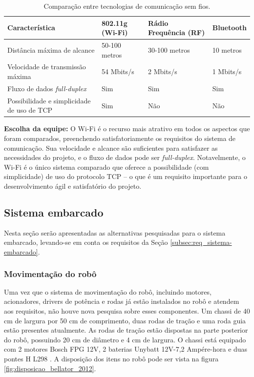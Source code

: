 \begin{table}[h]
  \caption{Comparação entre tecnologias de comunicação sem fios.}
  \centering
  \begin{tabular}{p{4.5cm}|p{3cm}p{4cm}p{2cm}}
    \toprule
    \textbf{Característica} & \textbf{802.11g (Wi-Fi)} & \multicolumn{1}{l}{\textbf{Rádio Frequência (RF)}} & \textbf{Bluetooth}  \\
    \hline
    Distância máxima de alcance & 50-100 metros  & 30-100 metros & 10 metros \\
    \hline
    Velocidade de transmissão máxima & 54 Mbits/s & 2 Mbits/s & 1 Mbits/s \\
    \hline
    Fluxo de dados \textit{full-duplex} & Sim & Sim & Sim \\
    \hline
    Possibilidade e simplicidade de uso de TCP & Sim & Não & Não \\
    \bottomrule
  \end{tabular}
  \label{tab:alternativas_comunicacao}
\end{table}

\textbf{Escolha da equipe:} O Wi-Fi é o recurso mais atrativo em todos os aspectos que foram comparados, preenchendo satisfatoriamente os requisitos do sistema de comunicação. Sua velocidade e alcance são suficientes para satisfazer as necessidades do projeto, e o fluxo de dados pode ser \textit{full-duplex}. Notavelmente, o Wi-Fi é o único sistema comparado que oferece a possibilidade (com simplicidade) de uso do protocolo TCP -- o que é um requisito importante para o desenvolvimento ágil e satisfatório do projeto.


\subsection{Sistema embarcado}

Nesta seção serão apresentadas as alternativas pesquisadas para o sistema embarcado, levando-se em conta os requisitos da Seção \ref{subsec:req_sistema-embarcado}.

\subsubsection{Movimentação do robô}

Uma vez que o sistema de movimentação do robô, incluindo motores, acionadores, drivers de potência e rodas já estão instalados no robô e atendem aos requisitos, não houve nova pesquisa sobre esses componentes. Um chassi de 40 cm de largura por 50 cm de comprimento, duas rodas de tração e uma roda guia estão presentes atualmente. As rodas de tração estão dispostas na parte posterior do robô, possuindo 20 cm de diâmetro e 4 cm de largura. O chassi está equipado com 2 motores Bosch FPG 12V, 2 baterias Unybatt 12V-7,2 Ampére-hora e duas pontes H L298 \cite{bellator_2012}. A disposição dos itens no robô pode ser vista na figura \ref{fig:disposicao_bellator_2012}.

